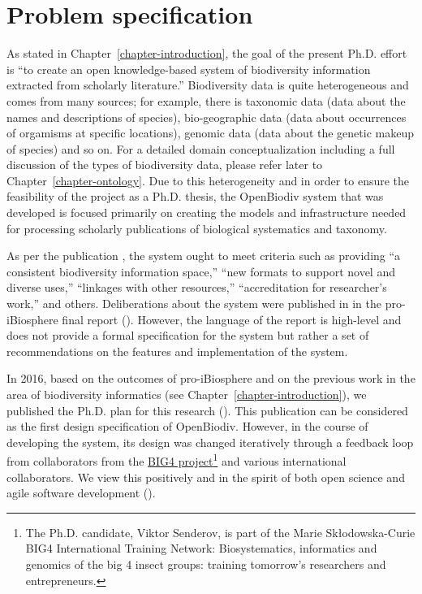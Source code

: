 \chapter{Problem specification}
\label{chapter-problem-defintion}

As stated in Chapter~\ref{chapter-introduction}, the goal of the present Ph.D. effort is ``to create an open knowledge-based system of biodiversity information extracted from scholarly literature.'' Biodiversity data is quite heterogeneous and comes from many sources; for example, there is taxonomic data (data about the names and descriptions of species), bio-geographic data (data about occurrences of orgamisms at specific locations), genomic data (data about the genetic makeup of species) and so on. For a detailed domain conceptualization including a full discussion of the types of biodiversity data, please refer later to Chapter~\ref{chapter-ontology}. Due to this heterogeneity and in order to ensure the feasibility of the project as a Ph.D. thesis, the OpenBiodiv system that was developed is focused primarily on creating the models and infrastructure needed for processing scholarly publications of biological systematics and taxonomy. 

As per the publication \cite{noauthor_open_2014}, the system ought to meet criteria such as providing ``a consistent biodiversity information space,'' ``new formats to support novel and diverse uses,'' ``linkages with other resources,'' ``accreditation for researcher's work,'' and others. Deliberations about the system were published in in the pro-iBiosphere final report (\cite{soraya_sierra_coordination_2014}). However, the language of the report is high-level and does not provide a formal specification for the system but rather a set of recommendations on the features and implementation of the system.

In 2016, based on the outcomes of pro-iBiosphere and on the previous work in the area of biodiversity informatics (see Chapter~\ref{chapter-introduction}), we published the Ph.D. plan for this research (\cite{senderov_open_2016}). This publication can be considered as the first design specification of OpenBiodiv. However, in the course of developing the system, its design was changed iteratively through a feedback loop from collaborators from the \href{http://big4-project.eu}{BIG4 project}\footnote{The Ph.D. candidate, Viktor Senderov, is part of the Marie Skłodowska-Curie BIG4 International Training Network: Biosystematics, informatics and genomics of the big 4 insect groups: training tomorrow's researchers and entrepreneurs.} and various international collaborators. We view this positively and in the spirit of both open science and agile software development (\cite{beck_manifesto_2001}).


